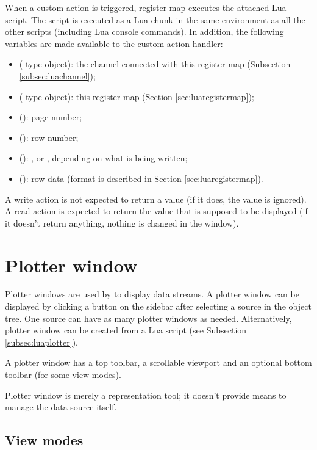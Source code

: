 \documentclass[a4paper,12pt,twoside,extrafontsizes]{memoir}
\begin{document}
When a custom action is triggered, register map executes the attached Lua script. The script is executed as a Lua chunk in the same environment as all the other scripts (including Lua console commands). In addition, the following variables are made available to the custom action handler:

\begin{itemize}
	\item {} ( type object): the channel connected with this register map (Subsection \ref{subsec:luachannel});
	\item {} ( type object): this register map (Section \ref{sec:luaregistermap});
	\item {} (): page number;
	\item {} (): row number;
	\item {} (): ,  or , depending on what is being written;
	\item {} (): row data (format is described in Section \ref{sec:luaregistermap}).
\end{itemize}

A write action is not expected to return a value (if it does, the value is ignored). A read action is expected to return the value that is supposed to be displayed (if it doesn't return anything, nothing is changed in the window).

\chapter{Plotter window}
\label{ch:plotter}

Plotter windows are used by  to display data streams. A plotter window can be displayed by clicking a  button on the sidebar after selecting a source in the object tree. One source can have as many plotter windows as needed. Alternatively, plotter window can be created from a Lua script (see Subsection \ref{subsec:luaplotter}).

A plotter window has a top toolbar, a scrollable viewport and an optional bottom toolbar (for some view modes).

Plotter window is merely a representation tool; it doesn't provide means to manage the data source itself.

\section{View modes}
\end{document}
